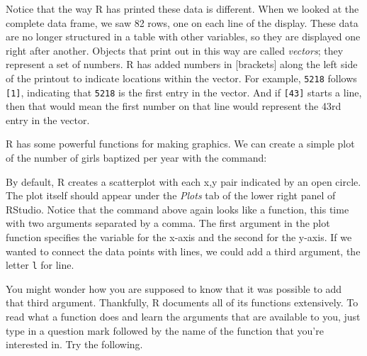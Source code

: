 \documentclass[]{book}
\newenvironment{Shaded}{\begin{snugshade}}{\end{snugshade}}
\newcommand{\KeywordTok}[1]{\textcolor[rgb]{0.13,0.29,0.53}{\textbf{{#1}}}}
\newcommand{\DataTypeTok}[1]{\textcolor[rgb]{0.13,0.29,0.53}{{#1}}}
\newcommand{\StringTok}[1]{\textcolor[rgb]{0.31,0.60,0.02}{{#1}}}
\newcommand{\NormalTok}[1]{{#1}}
\theoremstyle{definition}
\theoremstyle{definition}
\theoremstyle{definition}
\theoremstyle{remark}
\begin{document}
Notice that the way R has printed these data is different. When we
looked at the complete data frame, we saw 82 rows, one on each line of
the display. These data are no longer structured in a table with other
variables, so they are displayed one right after another. Objects that
print out in this way are called \emph{vectors}; they represent a set of
numbers. R has added numbers in {[}brackets{]} along the left side of
the printout to indicate locations within the vector. For example,
\texttt{5218} follows \texttt{{[}1{]}}, indicating that \texttt{5218} is
the first entry in the vector. And if \texttt{{[}43{]}} starts a line,
then that would mean the first number on that line would represent the
43rd entry in the vector.

R has some powerful functions for making graphics. We can create a
simple plot of the number of girls baptized per year with the command:

\begin{Shaded}
\end{Shaded}

By default, R creates a scatterplot with each x,y pair indicated by an
open circle. The plot itself should appear under the \emph{Plots} tab of
the lower right panel of RStudio. Notice that the command above again
looks like a function, this time with two arguments separated by a
comma. The first argument in the plot function specifies the variable
for the x-axis and the second for the y-axis. If we wanted to connect
the data points with lines, we could add a third argument, the letter
\texttt{l} for line.

\begin{Shaded}
\end{Shaded}

You might wonder how you are supposed to know that it was possible to
add that third argument. Thankfully, R documents all of its functions
extensively. To read what a function does and learn the arguments that
are available to you, just type in a question mark followed by the name
of the function that you're interested in. Try the following.
\end{document}
